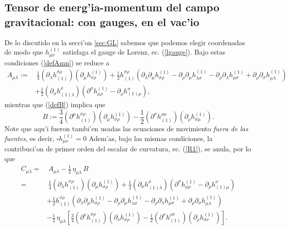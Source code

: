 \subsection{Tensor de energ'ia-momentum del campo gravitacional: con gauges, en el vac'io}
De lo discutido en la secci'on \ref{sec:GL} sabemos que podemos elegir coordenadas de modo que $h^{(1)}_{\mu\nu}$ satisfaga el gauge de Lorenz, ec. (\ref{lgauge}). Bajo estas condiciones (\ref{defAmn}) se reduce a
\begin{align}
A_{\mu\lambda} := & \ \frac{1}{4}(\partial_\lambda h^{\sigma\rho}_{(1)})
(\partial_\mu h_{\sigma\rho}^{(1)})+\frac{1}{2}h^{\sigma\rho}_{(1)}
\left(\partial_\lambda\partial_\mu h^{(1)}_{\sigma\rho}-\partial_\rho\partial_\mu
h^{(1)}_{\lambda\sigma}-\partial_\rho\partial_\lambda h^{(1)}_{\mu\sigma}
+ \partial_\rho\partial_\sigma h^{(1)}_{\mu\lambda}\right) \\
& + \frac{1}{2} (\partial_\sigma h^\rho_{(1)\lambda})\left(\partial^\sigma h^{(1)}_{\mu\rho}-\partial_\rho h^\sigma_{(1)\mu}\right),
\end{align}
mientras que (\ref{defB}) implica que
\begin{equation}
B := %
 \frac{3}{4}(\partial^\mu h_{(1)}^{\sigma\rho})(\partial_\mu h^{(1)}_{\sigma\rho}) -\frac{1}{2}(\partial^\sigma h_{(1)}^{\rho\mu})(\partial_\rho h^{(1)}_{\sigma\mu}) .
\end{equation}
Note que aqu'i fueron tambi'en usadas las ecuaciones de movimiento \textit{fuera de las fuentes}, es decir, $\square h^{(1)}_{\mu\nu}=0$
Adem'as, bajo las mismas condiciones, la contribuci'on de primer orden del escalar de curvatura, ec. (\ref{R1}), se anula, por lo que
\begin{align}
C_{\mu\lambda} =&\  A_{\mu\lambda}-\frac{1}{2}\,\eta_{\mu\lambda}\, B \\
 = & \  \frac{1}{4}(\partial_\lambda h^{\sigma\rho}_{(1)})
(\partial_\mu h_{\sigma\rho}^{(1)}) + \frac{1}{2} (\partial_\sigma h^\rho_{(1)\lambda})\left(\partial^\sigma h^{(1)}_{\mu\rho}-\partial_\rho h^\sigma_{(1)\mu}\right) \nonumber\\
& +\frac{1}{2}h^{\sigma\rho}_{(1)}
\left(\partial_\lambda\partial_\mu h^{(1)}_{\sigma\rho}-\partial_\rho\partial_\mu
h^{(1)}_{\lambda\sigma}-\partial_\rho\partial_\lambda h^{(1)}_{\mu\sigma}
+ \partial_\rho\partial_\sigma h^{(1)}_{\mu\lambda}\right)
\nonumber \\
& -\frac{1}{2}\,\eta_{\mu\lambda}\left[ \frac{3}{4}(\partial^\nu h_{(1)}^{\sigma\rho})(\partial_\nu h^{(1)}_{\sigma\rho})
-\frac{1}{2}(\partial^\sigma h_{(1)}^{\rho\nu})(\partial_\rho h^{(1)}_{\sigma\nu})\right] .
\end{align}

